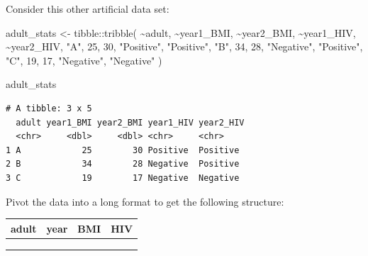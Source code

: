 \documentclass[
  letterpaper,
  DIV=11,
  numbers=noendperiod]{scrreprt}
\newenvironment{Shaded}{\begin{snugshade}}{\end{snugshade}}
\newcommand{\DecValTok}[1]{\textcolor[rgb]{0.68,0.00,0.00}{#1}}
\newcommand{\FunctionTok}[1]{\textcolor[rgb]{0.28,0.35,0.67}{#1}}
\newcommand{\NormalTok}[1]{\textcolor[rgb]{0.00,0.23,0.31}{#1}}
\newcommand{\OtherTok}[1]{\textcolor[rgb]{0.00,0.23,0.31}{#1}}
\newcommand{\SpecialCharTok}[1]{\textcolor[rgb]{0.37,0.37,0.37}{#1}}
\newcommand{\StringTok}[1]{\textcolor[rgb]{0.13,0.47,0.30}{#1}}
\begin{document}
\begin{tcolorbox}[enhanced jigsaw, titlerule=0mm, colback=white, left=2mm, breakable, opacitybacktitle=0.6, colbacktitle=quarto-callout-tip-color!10!white, colframe=quarto-callout-tip-color-frame, bottomtitle=1mm, opacityback=0, coltitle=black, arc=.35mm, toptitle=1mm, title=\textcolor{quarto-callout-tip-color}{\faLightbulb}\hspace{0.5em}{Practice}, leftrule=.75mm, toprule=.15mm, bottomrule=.15mm, rightrule=.15mm]

Consider this other artificial data set:

\begin{Shaded}
\begin{Highlighting}[]
\NormalTok{adult\_stats }\OtherTok{\textless{}{-}} 
\NormalTok{  tibble}\SpecialCharTok{::}\FunctionTok{tribble}\NormalTok{(}
    \SpecialCharTok{\textasciitilde{}}\NormalTok{adult,  }\SpecialCharTok{\textasciitilde{}}\NormalTok{year1\_BMI,  }\SpecialCharTok{\textasciitilde{}}\NormalTok{year2\_BMI,  }\SpecialCharTok{\textasciitilde{}}\NormalTok{year1\_HIV,  }\SpecialCharTok{\textasciitilde{}}\NormalTok{year2\_HIV,}
       \StringTok{"A"}\NormalTok{,          }\DecValTok{25}\NormalTok{,          }\DecValTok{30}\NormalTok{,  }\StringTok{"Positive"}\NormalTok{,  }\StringTok{"Positive"}\NormalTok{,}
       \StringTok{"B"}\NormalTok{,          }\DecValTok{34}\NormalTok{,          }\DecValTok{28}\NormalTok{,  }\StringTok{"Negative"}\NormalTok{,  }\StringTok{"Positive"}\NormalTok{,}
       \StringTok{"C"}\NormalTok{,          }\DecValTok{19}\NormalTok{,          }\DecValTok{17}\NormalTok{,  }\StringTok{"Negative"}\NormalTok{,  }\StringTok{"Negative"}
\NormalTok{  )}


\NormalTok{adult\_stats}
\end{Highlighting}
\end{Shaded}

\begin{verbatim}
# A tibble: 3 x 5
  adult year1_BMI year2_BMI year1_HIV year2_HIV
  <chr>     <dbl>     <dbl> <chr>     <chr>    
1 A            25        30 Positive  Positive 
2 B            34        28 Negative  Positive 
3 C            19        17 Negative  Negative 
\end{verbatim}

Pivot the data into a long format to get the following structure:

\begin{longtable}[]{@{}llll@{}}
\toprule\noalign{}
adult & year & BMI & HIV \\
\midrule\noalign{}
\endhead
\bottomrule\noalign{}
\endlastfoot
& & & \\
& & & \\
& & & \\
\end{longtable}


\end{tcolorbox}
\end{document}
